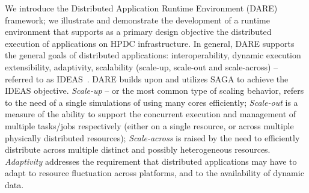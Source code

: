 \documentclass[]{svjour3}
\begin{document}



We introduce the Distributed Application Runtime Environment (DARE)
framework; we illustrate and demonstrate the development of a runtime
environment that supports as a primary design objective the
distributed execution of applications on HPDC infrastructure.  In
general, DARE supports the general goals of distributed applications:
interoperability, dynamic execution %
extensibility, adaptivity, scalability (scale-up, scale-out and
scale-across) -- referred to as IDEAS~\cite{ideas}.  DARE builds upon
and utilizes SAGA to achieve the IDEAS objective.  {\it Scale-up} --
or the most common type of scaling behavior, refers to the need of a
single simulations of using many cores efficiently; {\it Scale-out} is
a measure of the ability to support the concurrent execution and
management of multiple tasks/jobs respectively (either on a single
resource, or across multiple physically distributed resources); {\it
  Scale-across} is raised by the need to efficiently distribute across
multiple distinct and possibly heterogeneous resources. {\it
  Adaptivity} addresses the requirement that distributed applications
may have to adapt to resource fluctuation across platforms, and to the
availability of dynamic data.
\end{document}
